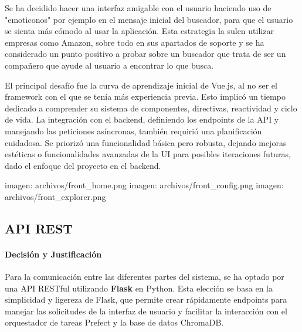 Se ha decidido hacer una interfaz amigable con el usuario haciendo uso de "emoticonos" por ejemplo en el mensaje inicial del buscador, para que el usuario se sienta más cómodo al usar la aplicación. Esta estrategia la sulen utilizar empresas como Amazon, sobre todo en sus apartados de soporte y se ha considerado un punto positivo a probar sobre un buscador que trata de ser un compañero que ayude al usuario a encontrar lo que busca.

El principal desafío fue la curva de aprendizaje inicial de Vue.js, al no ser el framework con el que se tenía más experiencia previa. Esto implicó un tiempo dedicado a comprender su sistema de componentes, directivas, reactividad y ciclo de vida. La integración con el backend, definiendo los endpoints de la API y manejando las peticiones asíncronas, también requirió una planificación cuidadosa. Se priorizó una funcionalidad básica pero robusta, dejando mejoras estéticas o funcionalidades avanzadas de la UI para posibles iteraciones futuras, dado el enfoque del proyecto en el backend.

imagen: archivos/front_home.png
imagen: archivos/front_config.png
imagen: archivos/front_explorer.png

\subsection{API REST}
\label{subsec:decision_api}
\paragraph{Decisión y Justificación}
Para la comunicación entre las diferentes partes del sistema, se ha optado por una API RESTful utilizando \textbf{Flask} en Python. Esta elección se basa en la simplicidad y ligereza de Flask, que permite crear rápidamente endpoints para manejar las solicitudes de la interfaz de usuario y facilitar la interacción con el orquestador de tareas Prefect y la base de datos ChromaDB.

